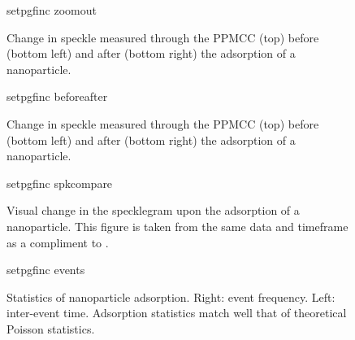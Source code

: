 \begin{figure}
\centering
{setpgfinc}
{zoomout}
\caption{Change in speckle measured through the PPMCC (top) before (bottom
left) and after (bottom right) the adsorption of a nanoparticle.  }
\label{fig:zoomout}
\end{figure}

\begin{figure}
\centering
{setpgfinc}
{beforeafter}
\caption{Change in speckle measured through the PPMCC (top) before (bottom
left) and after (bottom right) the adsorption of a nanoparticle.  }
\label{fig:scattbeforeafterone}
\end{figure}

\begin{figure}
\centering
{setpgfinc}
{spkcompare}
\caption{Visual change in the specklegram upon the adsorption of a
				nanoparticle.  This figure is taken from the same data and timeframe
				as a compliment to .}
\label{fig:scattspkcomparetwo}
\end{figure}

\begin{figure}
\centering
{setpgfinc}
{events}
\caption{Statistics of nanoparticle adsorption.  Right: event frequency.
Left: inter-event time.  Adsorption statistics match well that of theoretical
Poisson statistics.}
\label{fig:scattbeforeafterthree}
\end{figure}

